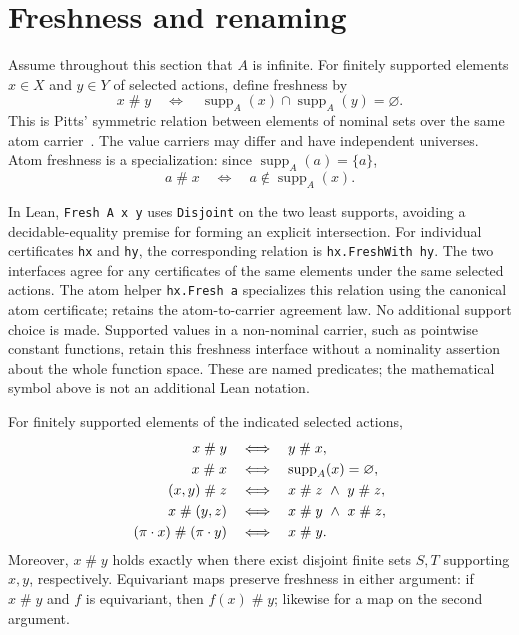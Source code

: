 \section{Freshness and renaming}
\label{sec:freshness}

Assume throughout this section that $A$ is infinite. For finitely supported
elements $x\in X$ and $y\in Y$ of selected actions, define freshness by
\[
  x\mathrel{\#}y\quad\Longleftrightarrow\quad
  \operatorname{supp}_A(x)\cap\operatorname{supp}_A(y)=\varnothing.
\]
This is Pitts' symmetric relation between elements of nominal sets over
the same atom carrier~\cite[Section~3.1, equation~(3.1)]{pitts2013}.
The value carriers may differ and have independent universes. Atom freshness
is a specialization: since $\operatorname{supp}_A(a)=\{a\}$,
\[
  a\mathrel{\#}x\quad\Longleftrightarrow\quad
  a\notin\operatorname{supp}_A(x).
\]

In Lean, \texttt{Fresh A x y} uses \texttt{Disjoint} on the two least supports,
avoiding a decidable-equality premise for forming an explicit intersection.
For individual certificates \texttt{hx} and \texttt{hy}, the corresponding
relation is \texttt{hx.FreshWith hy}. The two interfaces agree for any
certificates of the same elements under the same selected actions. The
atom helper \texttt{hx.Fresh a} specializes this relation using the canonical
atom certificate;  retains the atom-to-carrier agreement law.
No additional support choice is made. Supported values in a non-nominal
carrier, such as pointwise constant functions, retain this freshness
interface without a nominality assertion about the whole function space.
These are named predicates; the mathematical symbol above is not an
additional Lean notation.

\begin{proposition}
\label{prop:general-freshness}
For finitely supported elements of the indicated selected actions,
\begin{align*}
 x\mathrel{\#}y&\quad\Longleftrightarrow\quad y\mathrel{\#}x,\\
 x\mathrel{\#}x&\quad\Longleftrightarrow\quad
   \operatorname{supp}_A(x)=\varnothing,\\
 (x,y)\mathrel{\#}z&\quad\Longleftrightarrow\quad
   x\mathrel{\#}z\ \land\ y\mathrel{\#}z,\\
 x\mathrel{\#}(y,z)&\quad\Longleftrightarrow\quad
   x\mathrel{\#}y\ \land\ x\mathrel{\#}z,\\
 (\pi\mathbin{\cdot} x)\mathrel{\#}(\pi\mathbin{\cdot} y)&\quad\Longleftrightarrow\quad x\mathrel{\#}y.
\end{align*}
Moreover, $x\mathrel{\#}y$ holds exactly when there exist disjoint finite
sets $S,T$ supporting $x,y$, respectively. Equivariant maps preserve
freshness in either argument: if $x\mathrel{\#}y$ and $f$ is equivariant,
then $f(x)\mathrel{\#}y$; likewise for a map on the second argument.
\end{proposition}


